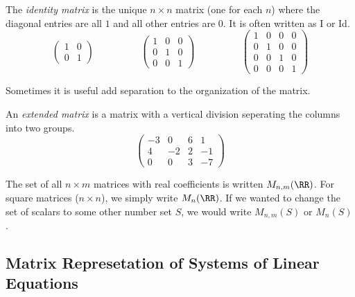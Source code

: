 \documentclass[fleqn]{report}
\begin{document}
\begin{defn}
The \emph{identity matrix} is the unique $n \times n$ matrix
(one for each $n$) where the diagonal entries are all
$1$ and all other entries are $0$. It is often written as I or 
Id.
\begin{displaymath}
\left( 
\begin{matrix}
1 & 0 \\
0 & 1
\end{matrix}
\right)
\hspace{2cm}
\left( 
\begin{matrix}
1 & 0 & 0 \\
0 & 1 & 0 \\
0 & 0 & 1 
\end{matrix}
\right)
\hspace{2cm}
\left( 
\begin{matrix}
1 & 0 & 0 & 0 \\
0 & 1 & 0 & 0 \\
0 & 0 & 1 & 0 \\
0 & 0 & 0 & 1
\end{matrix}
\right)
\end{displaymath}
\end{defn}

Sometimes it is useful add separation to the organization of
the matrix. 

\begin{defn}
An \emph{extended matrix} is a matrix with a vertical division
seperating the columns into two groups. 
\begin{displaymath}
\left(
\begin{array}{ccc|c}
-3 & 0 & 6 & 1 \\
4 & -2 & 2 & -1 \\
0 & 0 & 3 & -7 
\end{array}
\right) 
\end{displaymath}
\end{defn}

\begin{defn}
The set of all $n \times m$ matrices with real coefficients is
written $M_{n,m}(\RR)$. For square matrices ($n \times n$),
we simply write $M_n(\RR)$. If we wanted to change the set of
scalars to some other number set $S$, we would write
$M_{n,m}(S)$ or $M_n(S)$.
\end{defn}

\subsection{Matrix Represetation of Systems of Linear Equations}
\label{matrix-representation-of-systems}
\end{document}
